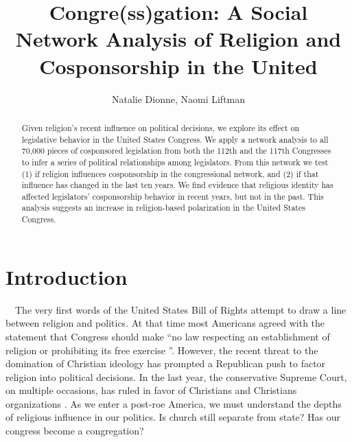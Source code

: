 \documentclass[Royal,times,sageh]{sagej}
\begin{document}

\title{Congre(ss)gation: A Social Network Analysis of Religion and
Cosponsorship in the United}


\author{Natalie Dionne, Naomi Liftman}




\begin{abstract}
Given religion's recent influence on political decisions, we explore its
effect on legislative behavior in the United States Congress. We apply a
network analysis to all 70,000 pieces of cosponsored legislation from
both the 112th and the 117th Congresses to infer a series of political
relationships among legislators. From this network we test (1) if
religion influences cosponsorship in the congressional network, and (2)
if that influence has changed in the last ten years. We find evidence
that religious identity has affected legislators' cosponsorship behavior
in recent years, but not in the past. This analysis suggests an increase
in religion-based polarization in the United States Congress.
\end{abstract}


\maketitle

\singlespacing

\hypertarget{introduction}{%
\section{Introduction}\label{introduction}}

\doublespacing

~~The very first words of the United States Bill of Rights attempt to
draw a line between religion and politics. At that time most Americans
agreed with the statement that Congress should make ``no law respecting
an establishment of religion or prohibiting its free exercise
\citeyearpar{billrights}''. However, the recent threat to the domination
of Christian ideology has prompted a Republican push to factor religion
into political decisions. In the last year, the conservative Supreme
Court, on multiple occasions, has ruled in favor of Christians and
Christians organizations \citep{bum2023}. As we enter a post-roe
America, we must understand the depths of religious influence in our
politics. Is church still separate from state? Has our congress become a
congregation?
\end{document}
